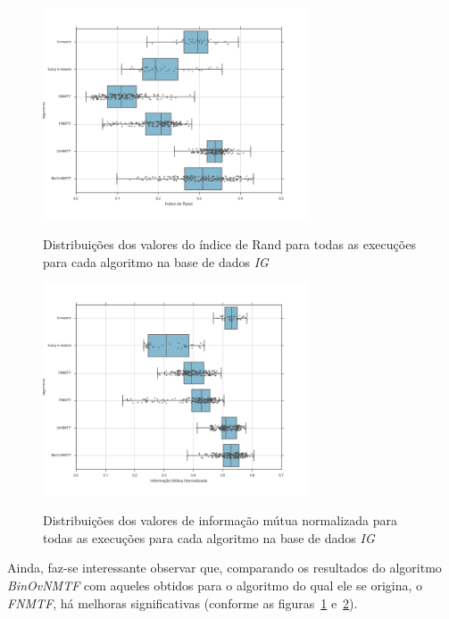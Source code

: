 \documentclass[
    12pt,                %
    oneside,            %
    a4paper,            %
    english,            %
    brazil                %
    ]{abntex2ppgsi}
\begin{document}
\begin{figure}[H]
    \centering
    \caption{Distribuições dos valores do índice de Rand para todas as execuções para cada algoritmo na base de dados \textit{IG}}
    \includegraphics[width=0.7\textwidth]{img/boxplot-all-rand-ig.png}
    \label{fig:boxplot-all-rand:ig}
\end{figure}

\begin{figure}[H]
    \centering
    \caption{Distribuições dos valores de informação mútua normalizada para todas as execuções para cada algoritmo na base de dados \textit{IG}}
    \includegraphics[width=0.7\textwidth]{img/boxplot-all-nmi-ig.png}
    \label{fig:boxplot-all-nmi:ig}
\end{figure}

Ainda, faz-se interessante observar que, comparando os resultados do algoritmo \textit{BinOvNMTF} com aqueles obtidos para o algoritmo do qual ele se origina, o \textit{FNMTF}, há melhoras significativas (conforme as figuras~\ref{fig:boxplot-all-rand:ig} e~\ref{fig:boxplot-all-nmi:ig}).
\end{document}
